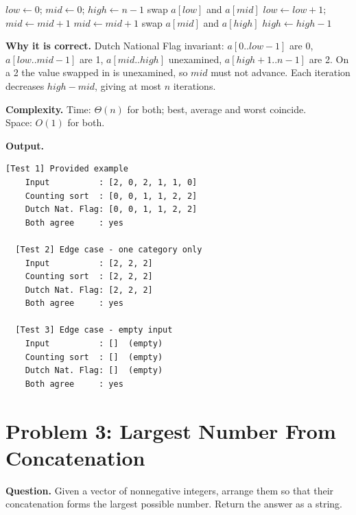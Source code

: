 \documentclass[11pt]{article}
\begin{document}
\begin{algorithm}[H]
\caption{Sort Colors -- Dutch National Flag (one pass)}
\begin{algorithmic}[1]
    \State $low \gets 0$; \quad $mid \gets 0$; \quad $high \gets n - 1$
            \State swap $a[low]$ and $a[mid]$
            \State $low \gets low + 1$; \quad $mid \gets mid + 1$
            \State $mid \gets mid + 1$
        \Else {}
            \State swap $a[mid]$ and $a[high]$
            \State $high \gets high - 1$ 
        \EndIf
    \EndWhile
\EndFunction
\end{algorithmic}
\end{algorithm}

\textbf{Why it is correct.} Dutch National Flag invariant: $a[0..low{-}1]$ are 0, $a[low..mid{-}1]$ are 1, $a[mid..high]$ unexamined, $a[high{+}1..n{-}1]$ are 2. On a 2 the value swapped in is unexamined, so $mid$ must not advance. Each iteration decreases $high-mid$, giving at most $n$ iterations.

\textbf{Complexity.} Time: $\Theta(n)$ for both; best, average and worst coincide.\\
Space: $O(1)$ for both.

\textbf{Output.}

\begin{lstlisting}[style=term]
  [Test 1] Provided example
    Input          : [2, 0, 2, 1, 1, 0]
    Counting sort  : [0, 0, 1, 1, 2, 2]
    Dutch Nat. Flag: [0, 0, 1, 1, 2, 2]
    Both agree     : yes

  [Test 2] Edge case - one category only
    Input          : [2, 2, 2]
    Counting sort  : [2, 2, 2]
    Dutch Nat. Flag: [2, 2, 2]
    Both agree     : yes

  [Test 3] Edge case - empty input
    Input          : []  (empty)
    Counting sort  : []  (empty)
    Dutch Nat. Flag: []  (empty)
    Both agree     : yes
\end{lstlisting}

\newpage

\section*{Problem 3: Largest Number From Concatenation}
\textbf{Question.} Given a vector of nonnegative integers, arrange them so that their concatenation forms the largest possible number. Return the answer as a string.
\end{document}
